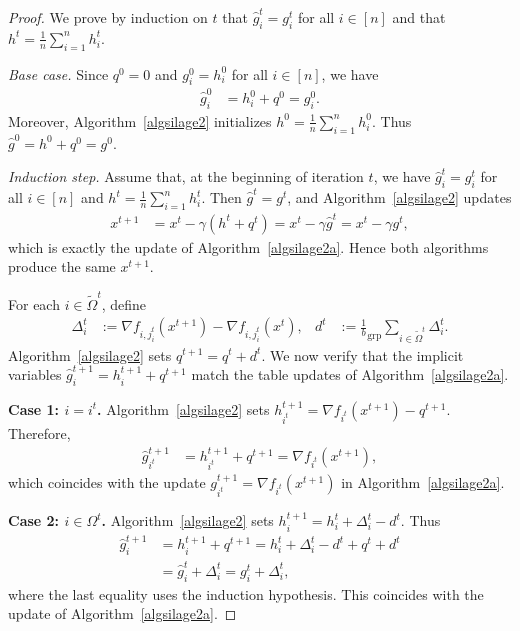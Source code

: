 \documentclass{article}
\newcommand{\eqdef}{:=}
\newcommand{\rb}[1]{\left(#1\right)}
\theoremstyle{plain}
\begin{document}
\begin{proof}
We prove by induction on $t$ that $\widehat g_i^t=g_i^t$ for all $i\in[n]$ and that $h^t=\frac1n\sum_{i=1}^n h_i^t$.

\emph{Base case.}
Since $q^0=0$ and $g_i^0=h_i^0$ for all $i\in[n]$, we have
\begin{align*}
\widehat g_i^0
&=
h_i^0+q^0
=
g_i^0.
\end{align*}
Moreover, Algorithm~\ref{algsilage2} initializes $h^0=\frac1n\sum_{i=1}^n h_i^0$.
Thus $\widehat g^0=h^0+q^0=g^0$.

\emph{Induction step.}
Assume that, at the beginning of iteration $t$, we have $\widehat g_i^t=g_i^t$ for all $i\in[n]$ and $h^t=\frac1n\sum_{i=1}^n h_i^t$.
Then $\widehat g^t=g^t$, and Algorithm~\ref{algsilage2} updates
\begin{align*}
x^{t+1}
&=
x^t-\gamma\rb{h^t+q^t}
=
x^t-\gamma \widehat g^t
=
x^t-\gamma g^t,
\end{align*}
which is exactly the update of Algorithm~\ref{algsilage2a}.
Hence both algorithms produce the same $x^{t+1}$.

For each $i\in\tilde{\Omega}^t$, define
\begin{align*}
\Delta_i^t
&\eqdef
\nabla f_{i,j_i^t}(x^{t+1})-\nabla f_{i,j_i^t}(x^t),
&
d^t
&\eqdef
\frac1b_{\mathrm{grp}}\sum_{i\in\tilde{\Omega}^t}\Delta_i^t .
\end{align*}
Algorithm~\ref{algsilage2} sets $q^{t+1}=q^t+d^t$.
We now verify that the implicit variables $\widehat g_i^{t+1}=h_i^{t+1}+q^{t+1}$ match the table updates of Algorithm~\ref{algsilage2a}.

\smallskip
\noindent\textbf{Case 1: $i=i^t$.}
Algorithm~\ref{algsilage2} sets $h_{i^t}^{t+1}=\nabla f_{i^t}(x^{t+1})-q^{t+1}$.
Therefore,
\begin{align*}
\widehat g_{i^t}^{t+1}
&=
h_{i^t}^{t+1}+q^{t+1}
=
\nabla f_{i^t}(x^{t+1}),
\end{align*}
which coincides with the update $g_{i^t}^{t+1}=\nabla f_{i^t}(x^{t+1})$ in Algorithm~\ref{algsilage2a}.

\smallskip
\noindent\textbf{Case 2: $i\in\Omega^t$.}
Algorithm~\ref{algsilage2} sets $h_i^{t+1}=h_i^t+\Delta_i^t-d^t$.
Thus
\begin{align*}
\widehat g_i^{t+1}
&=
h_i^{t+1}+q^{t+1}
=
h_i^t+\Delta_i^t-d^t+q^t+d^t
\\
&=
\widehat g_i^t+\Delta_i^t
=
g_i^t+\Delta_i^t,
\end{align*}
where the last equality uses the induction hypothesis.
This coincides with the update of Algorithm~\ref{algsilage2a}.


\end{proof}
\end{document}
